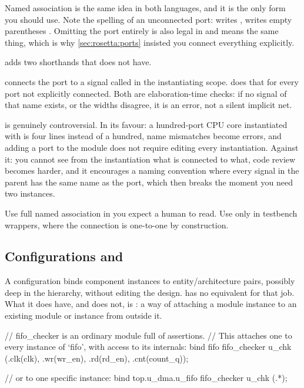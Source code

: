 Named association is the same idea in both languages, and it is the only form
you should use. Note the spelling of an unconnected port: \VHDL{} writes
, \SV{} writes empty parentheses . Omitting the port
entirely is also legal in \SV{} and means the same thing, which is why
\cref{sec:rosetta:ports} insisted you connect everything explicitly.

\SV{} adds two shorthands that \VHDL{} does not have.

 connects the port  to a signal called  in
the instantiating scope.  does that for every port not explicitly
connected. Both are elaboration-time checks: if no signal of that name exists,
or the widths disagree, it is an error, not a silent implicit net.

 is genuinely controversial. In its favour: a hundred-port CPU core
instantiated with  is four lines instead of a hundred, name mismatches
become errors, and adding a port to the module does not require editing every
instantiation. Against it: you cannot see from the instantiation what is
connected to what, code review becomes harder, and it encourages a naming
convention where every signal in the parent has the same name as the port,
which then breaks the moment you need two instances.

\begin{ruleofthumb}
Use full named association in \RTL{} you expect a human to read. Use 
only in testbench wrappers, where the connection is one-to-one by construction.
\end{ruleofthumb}

\subsection{Configurations and }

A \VHDL{} configuration binds component instances to entity/architecture pairs,
possibly deep in the hierarchy, without editing the design. \SV{} has no
equivalent for that job. What it does have, and \VHDL{} does not, is
: a way of attaching a module instance to an existing
module or instance from outside it.

\begin{svcode}[caption={\code{bind}: adding checkers without touching the \RTL{}.},label={lst:rosetta:bind}]
// fifo_checker is an ordinary module full of assertions.
// This attaches one to every instance of `fifo', with access to its internals:
bind fifo fifo_checker u_chk (.clk(clk), .wr(wr_en), .rd(rd_en), .cnt(count_q));

// or to one specific instance:
bind top.u_dma.u_fifo fifo_checker u_chk (.*);
\end{svcode}

